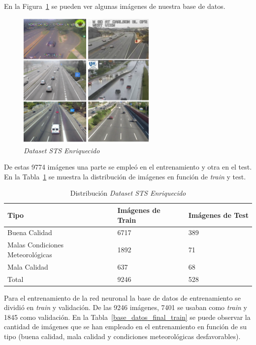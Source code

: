 En la Figura~\ref{fig.base_datos} se pueden ver algunas imágenes de nuestra base de datos.

\begin{figure}[H]
\begin{center}
	\includegraphics[width=0.6\textwidth]{figures/Diseno_global/base_datos.png}
   \caption{\textit{Dataset STS Enriquecido}}
	\label{fig.base_datos}
\end{center}
\end{figure}

De estas 9774 imágenes una parte se empleó en el entrenamiento y otra en el test. En la Tabla~\ref{tabla_distribucion_base_datos} se muestra la distribución de imágenes en función de \textit{train} y test.

\begin{table}[H] 
\begin{center}
\begin{tabular}{|l|l|l|}
\hline
Tipo & Imágenes de Train & Imágenes de Test  \\ 
\hline \hline
Buena Calidad & 6717 & 389  \\ \hline
Malas Condiciones Meteorológicas & 1892 & 71 \\ \hline
Mala Calidad  & 637 & 68  \\ \hline
Total & 9246 & 528 \\ \hline
\end{tabular}
\caption{Distribución \textit{Dataset STS Enriquecido}}
\label{tabla_distribucion_base_datos}
\end{center}
\end{table}

Para el entrenamiento de la red neuronal la base de datos de entrenamiento se dividió en \textit{train} y validación. De las 9246 imágenes, 7401 se usaban como \textit{train} y 1845 como validación. En la Tabla~\ref{base_datos_final_train} se puede observar la cantidad de imágenes que se han empleado en el entrenamiento en función de su tipo (buena calidad, mala calidad y condiciones meteorológicas desfavorables).

